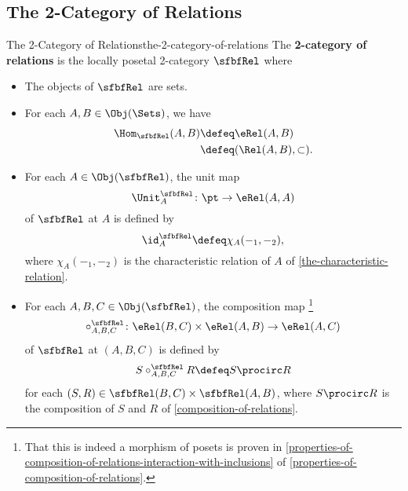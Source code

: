 \subsection{The 2-Category of Relations}\label{subsection-the-2-category-of-relations}
\begin{definition}{The 2-Category of Relations}{the-2-category-of-relations}%
    The \textbf{2-category of relations} is the locally posetal 2-category $\sfbfRel$ where
    \begin{itemize}
        \item{}The objects of $\sfbfRel$ are sets.
        \item{}For each $A,B\in\Obj(\Sets)$, we have
            \begin{align*}
                \Hom_{\sfbfRel}(A,B) &\defeq \eRel(A,B)\\%
                                     &\defeq (\Rel(A,B),\subset).%
            \end{align*}
        \item{}For each $A\in\Obj(\sfbfRel)$, the unit map
            \[
                \Unit^{\sfbfRel}_{A}
                \colon
                \pt
                \to
                \eRel(A,A)
            \]%
            of $\sfbfRel$ at $A$ is defined by
            \[
                \id^{\sfbfRel}_{A}
                \defeq
                \chi_{A}(-_{1},-_{2}),
            \]%
            where $\chi_{A}(-_{1},-_{2})$ is the characteristic relation of $A$ of \cref{the-characteristic-relation}.
        \item{}For each $A,B,C\in\Obj(\sfbfRel)$, the composition map%
            \footnote{%
                That this is indeed a morphism of posets is proven in \cref{properties-of-composition-of-relations-interaction-with-inclusions} of \cref{properties-of-composition-of-relations}.
                \par\vspace*{\TCBBoxCorrection}
            }%
            \[
                \circ^{\sfbfRel}_{A,B,C}%
                \colon%
                \eRel(B,C)%
                \times%
                \eRel(A,B)%
                \to%
                \eRel(A,C)%
            \]%
            of $\sfbfRel$ at $(A,B,C)$ is defined by%
            \[
                S\mathbin{{\circ}^{\sfbfRel}_{A,B,C}}R
                \defeq
                S\procirc R
            \]%
            for each $(S,R)\in\sfbfRel(B,C)\times\sfbfRel(A,B)$, where $S\procirc R$ is the composition of $S$ and $R$ of \cref{composition-of-relations}.
    \end{itemize}
\end{definition}

